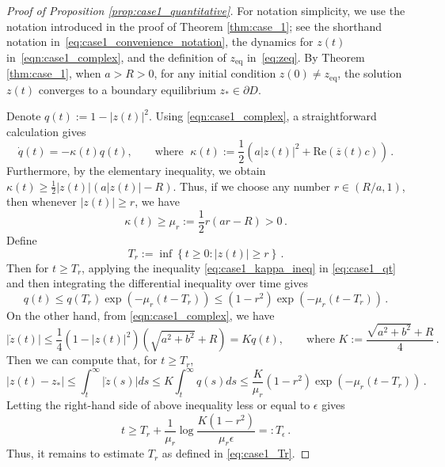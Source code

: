 \documentclass[10pt]{article}
\theoremstyle{definition}
\theoremstyle{definition}
\numberwithin{equation}{section}
\newcommand{\re}[1]{\mathrm{Re}\left(#1\right)}
\newcommand{\zeq}{z_{\mathrm{eq}}}
\begin{document}
\begin{proof}[Proof of Proposition \ref{prop:case1_quantitative}]
For notation simplicity, we use the notation introduced in the proof of Theorem \ref{thm:case_1}; see the shorthand notation in~\eqref{eq:case1_convenience_notation}, the dynamics for $z(t)$ in~\eqref{eqn:case1_complex}, and the definition of $\zeq$ in~\eqref{eq:zeq}.
By Theorem \ref{thm:case_1}, when $a > R > 0$, for any initial condition $z(0) \neq \zeq$, the solution $z(t)$ converges to a boundary equilibrium $z_* \in \partial D$.

Denote $q(t) := 1 - |z(t)|^2$. 
Using \eqref{eqn:case1_complex}, a straightforward calculation gives
\begin{equation}\label{eq:case1_qt}
    \dot{q} (t) = - \kappa(t) q(t), \qquad \text{where } \; \kappa(t) := \frac{1}{2} \left(a |z(t)|^2 + \re{\overline{z}(t) c} \right) \, .
\end{equation}
Furthermore, by the elementary inequality, we obtain $\kappa(t) \geq \frac{1}{2} |z(t)| \left( a|z(t)| - R \right)$.
Thus, if we choose any number $r \in (R/a, 1)$, then whenever $|z(t)| \geq r$, we have
\begin{equation}\label{eq:case1_kappa_ineq}
\kappa(t) \geq \mu_r := \frac{1}{2} r(ar - R) > 0 \, .
\end{equation}
Define
\begin{equation}\label{eq:case1_Tr}
    T_r := \inf \left\{ t \geq 0: |z(t)| \geq r \right\} \, .
\end{equation}
Then for $t \geq T_r$, applying the inequality \eqref{eq:case1_kappa_ineq} in \eqref{eq:case1_qt} and then integrating the differential inequality over time gives
\begin{equation*}
q(t) \leq q(T_r) \exp \left( - \mu_r (t - T_r) \right) \leq (1 - r^2) \exp \left( - \mu_r (t - T_r) \right) \, .
\end{equation*}
On the other hand, from \eqref{eqn:case1_complex}, we have
\begin{equation*}
    |\dot{z} (t)| \leq \frac{1}{4} \left( 1 - |z(t)|^2 \right) \left( \sqrt{a^2 + b^2} + R \right) = K q(t), \qquad \text{where } K:= \frac{\sqrt{a^2 + b^2} + R}{4} \, .
\end{equation*}
Then we can compute that, for $t \geq T_r$,
\begin{equation*}
    |z(t) - z_*| \leq \int_t^{\infty} |\dot{z}(s)|ds \leq K \int_t^{\infty} q(s) ds \leq \frac{K}{\mu_r} (1-r^2) \exp \left( - \mu_r (t - T_r) \right) \, .
\end{equation*}
Letting the right-hand side of above inequality less or equal to $\epsilon$ gives
\begin{equation*}
    t \geq T_r + \frac{1}{\mu_r} \log \frac{K(1-r^2)}{\mu_r \epsilon} =: T_{\epsilon} \, .
\end{equation*}
Thus, it remains to estimate $T_r$ as defined in \eqref{eq:case1_Tr}.


\end{proof}
\end{document}
